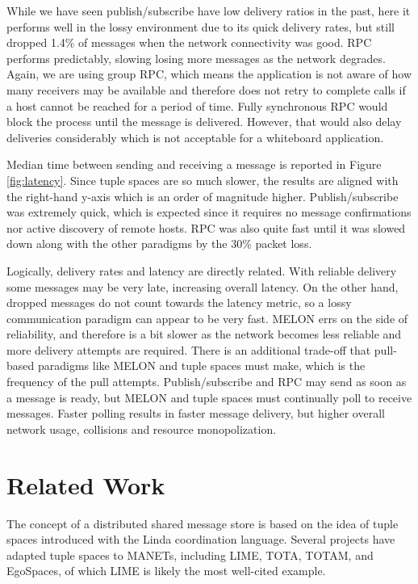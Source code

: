 \documentclass{llncs}
\begin{document}
While we have seen publish/subscribe have low delivery ratios in the past\cite{collins2010quantitative}, here it performs well in the lossy environment due to its quick delivery rates, but still dropped 1.4\% of messages when the network connectivity was good. RPC performs predictably, slowing losing more messages as the network degrades. Again, we are using group RPC, which means the application is not aware of how many receivers may be available and therefore does not retry to complete calls if a host cannot be reached for a period of time. Fully synchronous RPC would block the process until the message is delivered. However, that would also delay deliveries considerably which is not acceptable for a whiteboard application.

Median time between sending and receiving a message is reported in Figure \ref{fig:latency}. Since tuple spaces are so much slower, the results are aligned with the right-hand y-axis which is an order of magnitude higher. Publish/subscribe was extremely quick, which is expected since it requires no message confirmations nor active discovery of remote hosts. RPC was also quite fast until it was slowed down along with the other paradigms by the 30\% packet loss.

Logically, delivery rates and latency are directly related. With reliable delivery some messages may be very late, increasing overall latency. On the other hand, dropped messages do not count towards the latency metric, so a lossy communication paradigm can appear to be very fast. MELON errs on the side of reliability, and therefore is a bit slower as the network becomes less reliable and more delivery attempts are required. There is an additional trade-off that pull-based paradigms like MELON and tuple spaces must make, which is the frequency of the pull attempts. Publish/subscribe and RPC may send as soon as a message is ready, but MELON and tuple spaces must continually poll to receive messages. Faster polling results in faster message delivery, but higher overall network usage, collisions and resource monopolization.

\section{Related Work}\label{sec:relatedwork}

The concept of a distributed shared message store is based on the idea of tuple spaces introduced with the Linda\cite{linda} coordination language. Several projects have adapted tuple spaces to MANETs, including LIME\cite{lime}, TOTA\cite{tota}, TOTAM\cite{totam}, and EgoSpaces\cite{egospaces}, of which LIME is likely the most well-cited example.
\end{document}
